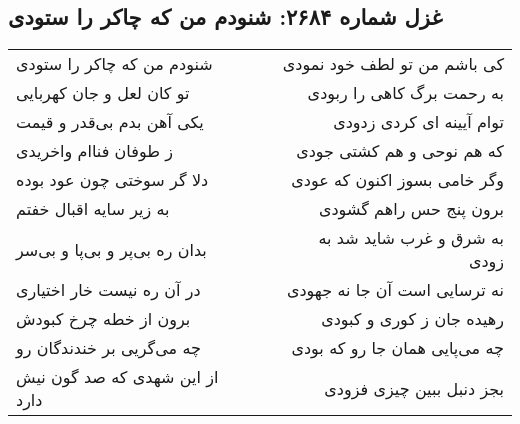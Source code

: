 \begin{center}
\section*{غزل شماره ۲۶۸۴: شنودم من که چاکر را ستودی}
\label{sec:2684}
\begin{longtable}{l p{0.5cm} r}
شنودم من که چاکر را ستودی
&&
کی باشم من تو لطف خود نمودی
\\
تو کان لعل و جان کهربایی
&&
به رحمت برگ کاهی را ربودی
\\
یکی آهن بدم بی‌قدر و قیمت
&&
توام آیینه ای کردی زدودی
\\
ز طوفان فناام واخریدی
&&
که هم نوحی و هم کشتی جودی
\\
دلا گر سوختی چون عود بوده
&&
وگر خامی بسوز اکنون که عودی
\\
به زیر سایه اقبال خفتم
&&
برون پنج حس راهم گشودی
\\
بدان ره بی‌پر و بی‌پا و بی‌سر
&&
به شرق و غرب شاید شد به زودی
\\
در آن ره نیست خار اختیاری
&&
نه ترسایی است آن جا نه جهودی
\\
برون از خطه چرخ کبودش
&&
رهیده جان ز کوری و کبودی
\\
چه می‌گریی بر خندندگان رو
&&
چه می‌پایی همان جا رو که بودی
\\
از این شهدی که صد گون نیش دارد
&&
بجز دنبل ببین چیزی فزودی
\\
\end{longtable}
\end{center}
